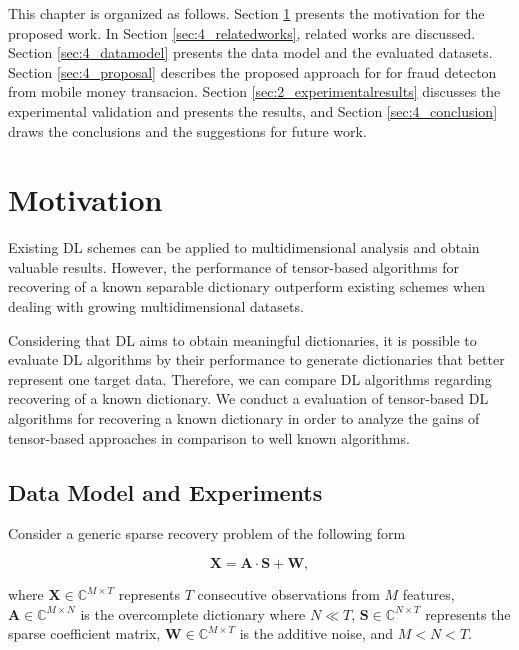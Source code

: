 This chapter is organized as follows. Section \ref{sec:4_motivation} presents the motivation for the proposed work. In Section \ref{sec:4_relatedworks}, related works are discussed. Section \ref{sec:4_datamodel} presents the data model and the evaluated datasets. Section \ref{sec:4_proposal} describes the proposed approach for for fraud detecton from mobile money transacion. Section \ref{sec:2_experimentalresults} discusses the experimental validation and presents the results, and Section \ref{sec:4_conclusion} draws the conclusions and the suggestions for future work.


\section{Motivation}
\label{sec:4_motivation}

Existing DL schemes can be applied to multidimensional analysis and obtain valuable results. However, the performance of tensor-based algorithms for recovering of a known separable dictionary outperform existing schemes when dealing with growing multidimensional datasets.

Considering that DL aims to obtain meaningful dictionaries, it is possible to evaluate DL algorithms by their performance to generate dictionaries that better represent one target data. Therefore, we can compare DL algorithms regarding recovering of a known dictionary. We conduct a evaluation of tensor-based DL algorithms for recovering a known dictionary in order to analyze the gains of tensor-based approaches in comparison to well known algorithms.

\subsection{Data Model and Experiments}
\label{sec:4_motivation_datamodel}

Consider a generic sparse recovery problem of the following form

\begin{equation}\label{eq:eq01}
\boldsymbol{X} = \boldsymbol{A} \cdot \boldsymbol{S} + \boldsymbol{W},
\end{equation}

where $\boldsymbol{X} \in \mathbb{C}^{M \times T}$ represents $T$ consecutive observations from $M$ features, $\boldsymbol{A} \in \mathbb{C}^{M \times N}$ is the overcomplete dictionary where $N \ll T$, $\boldsymbol{S} \in \mathbb{C}^{N \times T}$ represents the sparse coefficient matrix, $\boldsymbol{W} \in \mathbb{C}^{M \times T}$ is the additive noise, and $M < N < T$.

